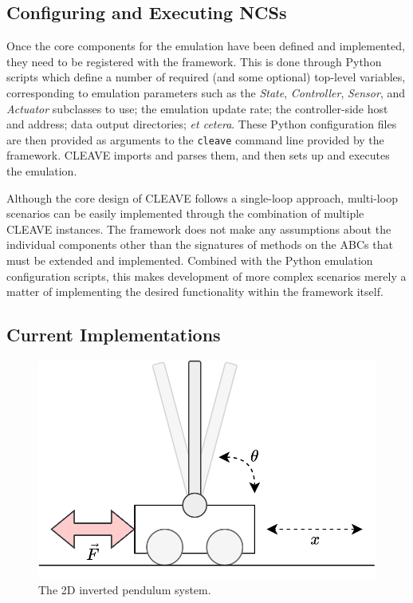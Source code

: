 \subsection{Configuring and Executing \acsp{NCS}}

Once the core components for the emulation have been defined and implemented, they need to be registered with the framework.
This is done through Python scripts which define a number of required (and some optional) top-level variables, corresponding to emulation parameters such as the \emph{State}, \emph{Controller}, \emph{Sensor}, and \emph{Actuator} subclasses to use; the emulation update rate; the controller-side host and address; data output directories; \emph{et cetera}.
These Python configuration files are then provided as arguments to the \texttt{cleave} command line provided by the framework.
\gls{CLEAVE} imports and parses them, and then sets up and executes the emulation.

Although the core design of \gls{CLEAVE} follows a single-loop approach, multi-loop scenarios can be easily implemented through the combination of multiple \gls{CLEAVE} instances.
The framework does not make any assumptions about the individual components other than the signatures of methods on the \glspl{ABC} that must be extended and implemented.
Combined with the Python emulation configuration scripts, this makes development of more complex scenarios merely a matter of implementing the desired functionality within the framework itself.

\subsection{Current Implementations}

\begin{figure}
    \centering
    \includegraphics[width=.6\columnwidth]{publications/2022CLEAVE/images/inverted_pendulum}
    \caption{
        The 2D inverted pendulum system.
    }\label{paper:olguinmunoz2022cleave:fig:invpend}
\end{figure}

